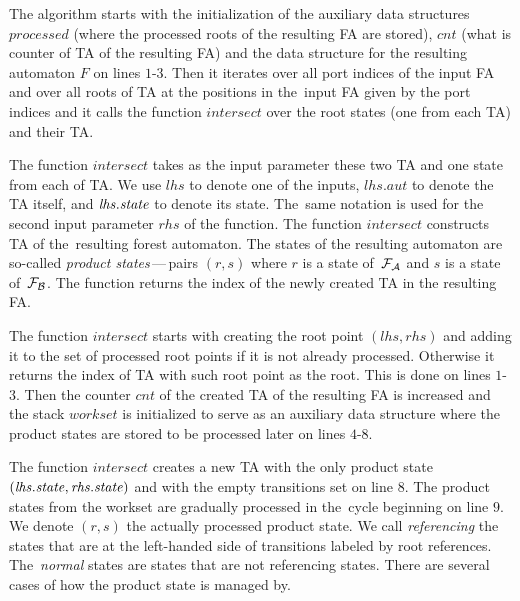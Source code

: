 The algorithm starts with the initialization of the auxiliary
data structures $\mathit{processed}$ (where the processed roots of the resulting FA are stored),
$\mathit{cnt}$ (what is counter of TA of the resulting FA)
and the data structure for the resulting automaton $F$ on lines $1$-$3$.
Then it iterates over all port indices of the input FA
and over all roots of TA at the positions in
the~input FA given by the port indices
and it calls the function $\mathit{intersect}$ over the root states
(one from each TA) and their TA.

The function $\mathit{intersect}$ takes as the input parameter these two TA
and one state from each of TA.
We use $\mathit{lhs}$ to denote one of the inputs,
$\mathit{lhs.aut}$ to denote the TA itself, and $\mathit{lhs.state}$ to denote its state.
The~same notation is used for the second input parameter $\mathit{rhs}$ of the function.
The function $\mathit{intersect}$ constructs TA of the~resulting forest automaton.
The states of the resulting automaton are so-called \emph{product states}\,---\,pairs $(r,s)$ where $r$ is a state of~$\mathcal{F}_{\mathcal{A}}$
and $s$ is a state of~$\mathcal{F}_{\mathcal{B}}$.
The function returns the index of the newly created TA in the resulting FA.

The function $\mathit{intersect}$ starts with creating the root point $(lhs,rhs)$ and
adding it to the set of processed root points if it is not already processed.
Otherwise it returns the index of TA with such root point as the root.
This is done on lines $1$-$3$.
Then the counter $\mathit{cnt}$ of the created TA of the resulting FA is increased and
the stack $\mathit{workset}$ is initialized to serve as an auxiliary data
structure where the product states are stored to be processed later on lines $4$-$8$.

The function $\mathit{intersect}$ creates a new TA with the only product state $(\mathit{lhs.state}, \mathit{rhs.state})$
and with the empty transitions set on line $8$.
The product states from the workset are gradually processed in the~cycle beginning
on line $9$.
We denote $(r,s)$ the actually processed product state.
We call \emph{referencing} the states that are at the left-handed side
of transitions labeled by root references.
The~\emph{normal} states are states that are not referencing states.
There are several cases of how the product state is managed by.



